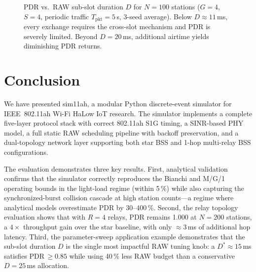 \documentclass[conference]{IEEEtran}
\begin{document}
\begin{figure}[!t]
\centering
{}
\caption{PDR vs.\ RAW sub-slot duration $D$ for $N{=}100$ stations
  ($G{=}4$, $S{=}4$, periodic traffic $T_\mathrm{pkt}{=}5$\,s, 3-seed
  average).
  Below $D{\approx}11$\,ms, every exchange requires the cross-slot mechanism
  and PDR is severely limited.
  Beyond $D{=}20$\,ms, additional airtime yields diminishing PDR returns.}
\label{fig:sweep_D}
\end{figure}

\section{Conclusion}
\label{sec:conc}

We have presented sim11ah, a modular Python discrete-event simulator for
IEEE~802.11ah Wi-Fi HaLow IoT research.
The simulator implements a complete five-layer protocol stack with correct
802.11ah S1G timing, a SINR-based PHY model, a full static RAW scheduling
pipeline with backoff preservation, and a dual-topology network layer
supporting both star BSS and 1-hop multi-relay BSS configurations.

The evaluation demonstrates three key results.
First, analytical validation confirms that the simulator correctly reproduces
the Bianchi and M/G/1 operating bounds in the light-load regime (within 5\,\%)
while also capturing the synchronized-burst collision cascade at high station
counts---a regime where analytical models overestimate PDR by 30--400\,\%.
Second, the relay topology evaluation shows that with $R{=}4$ relays, PDR
remains 1.000 at $N{=}200$ stations, a $4{\times}$ throughput gain over the
star baseline, with only ${\approx}3$\,ms of additional hop latency.
Third, the parameter-sweep application example demonstrates that the
sub-slot duration $D$ is the single most impactful RAW tuning knob:
a $D^*\!\approx\!15$\,ms satisfies PDR\,$\geq\!0.85$ while using
40\,\% less RAW budget than a conservative $D{=}25$\,ms allocation.
\end{document}
